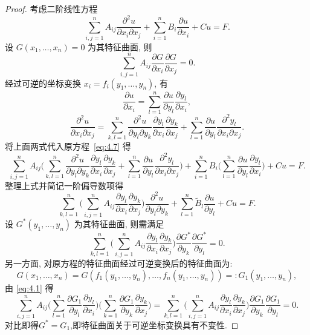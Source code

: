 \begin{proof}
  考虑二阶线性方程
  \begin{equation}\label{eq:4.7}
    \sum_{i,j=1}^nA_{ij}\frac{\partial^2u}{\partial x_i\partial x_j}
    + \sum_{i=1}^nB_i\frac{\partial u}{\partial x_i} + Cu = F.
  \end{equation}
  设 $G(x_1,\ldots,x_n)=0$ 为其特征曲面, 则
  \begin{equation}\label{eq:4.1}
    \sum_{i,j=1}^nA_{ij}\frac{\partial G}{\partial x_i}\frac{\partial G}{\partial x_j}=0.
  \end{equation}
  经过可逆的坐标变换 $x_i=f_i(y_1,\ldots,y_n)$, 有
  \[\frac{\partial u}{\partial x_i}
    = \sum_{l=1}^n\frac{\partial u}{\partial y_l}\frac{\partial y_l}{\partial x_i},\]
  \[\frac{\partial^2u}{\partial x_i\partial x_j}
    = \sum_{k,l=1}^n\frac{\partial^2u}{\partial y_l\partial y_k}\frac{\partial y_l}{\partial x_i}\frac{\partial y_k}{\partial x_j}
      + \sum_{l=1}^n\frac{\partial u}{\partial y_l}\frac{\partial^2y_l}{\partial x_i\partial x_j}.\]
  将上面两式代入原方程~\eqref{eq:4.7} 得
  \[ \sum_{i,j=1}^nA_{ij}\Biggl(\sum_{k,l=1}^n\frac{\partial^2u}{\partial y_l\partial y_k}\frac{\partial y_l}{\partial x_i}\frac{\partial y_k}{\partial x_j}
    + \sum_{l=1}^n\frac{\partial u}{\partial y_l}\frac{\partial^2y_l}{\partial x_i\partial x_j}\Biggr)
    + \sum_{i=1}^nB_i\Biggl(\sum_{l=1}^n\frac{\partial u}{\partial y_l}\frac{\partial y_l}{\partial x_i}\Biggr) + Cu = F. \]
  整理上式并简记一阶偏导数项得
  \[ \sum_{k,l=1}^n\Biggl(\sum_{i,j=1}^nA_{ij}\frac{\partial y_l}{\partial x_i}\frac{\partial y_k}{\partial x_j}\Biggr)\frac{\partial^2u}{\partial y_l\partial y_k}
    + \sum_{l=1}^n\widetilde{B}_l\frac{\partial u}{\partial y_l} + Cu = F. \]
  设 $G^*(y_1,\ldots,y_n)$ 为其特征曲面, 则需满足
  \[ \sum_{k,l=1}^n\Biggl(\sum_{i,j=1}^nA_{ij}\frac{\partial y_l}{\partial x_i}\frac{\partial y_k}{\partial x_j}\Biggr)\frac{\partial G^*}{\partial y_k}\frac{\partial G^*}{\partial y_l} = 0. \]
  另一方面, 对原方程的特征曲面经过可逆变换后的特征曲面为:
  \[ G(x_1,\ldots,x_n) = G(f_1(y_1,\ldots,y_n),\ldots,f_n(y_1,\ldots,y_n)) =: G_1(y_1,\ldots,y_n), \]
  由 \eqref{eq:4.1} 得
  \[ \sum_{i,j=1}^nA_{ij}\Biggl(\sum_{l=1}^n\frac{\partial G_1}{\partial y_l}\frac{\partial y_l}{\partial x_i}\Biggr)\Biggl(\sum_{k=1}^n\frac{\partial G_1}{\partial y_k}\frac{\partial y_k}{\partial x_j}\Biggr)
    = \sum_{k,l=1}^n\Biggl(\sum_{i,j=1}^nA_{ij}\frac{\partial y_l}{\partial x_i}\frac{\partial y_k}{\partial x_j}\Biggr)\frac{\partial G_1}{\partial y_k}\frac{\partial G_1}{\partial y_l}=0. \]
  对比即得$G^*=G_1$,即特征曲面关于可逆坐标变换具有不变性.
\end{proof}


